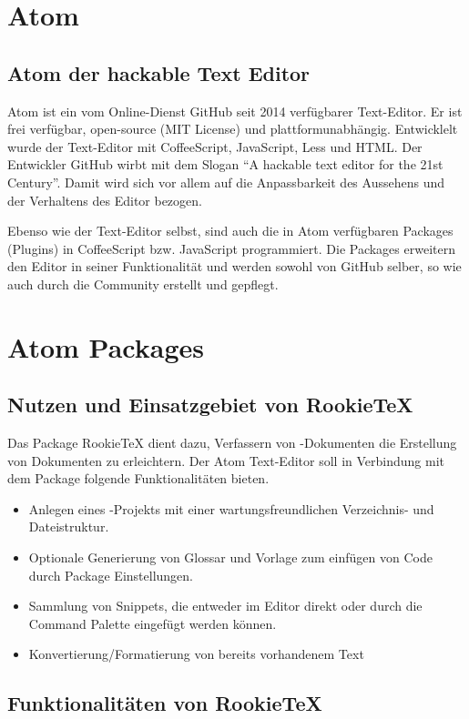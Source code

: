 \chapter{Atom}
    \section{Atom der hackable Text Editor}
    Atom ist ein vom Online-Dienst GitHub seit 2014 verfügbarer Text-Editor. Er ist frei verfügbar, open-source (MIT License) und plattformunabhängig. Entwicklelt wurde der Text-Editor mit CoffeeScript, JavaScript, Less und HTML. Der Entwickler GitHub wirbt mit dem Slogan "`A hackable text editor for the 21st Century"'. Damit wird sich vor allem auf die Anpassbarkeit des Aussehens und der Verhaltens des Editor bezogen.

    Ebenso wie der Text-Editor selbst, sind auch die in Atom verfügbaren Packages (Plugins) in CoffeeScript bzw. JavaScript programmiert. Die Packages erweitern den Editor in seiner Funktionalität und werden sowohl von GitHub selber, so wie auch durch die Community erstellt und gepflegt.

\chapter{Atom Packages}
    \section{Nutzen und Einsatzgebiet von RookieTeX}
    Das Package RookieTeX dient dazu, Verfassern von \tex-Dokumenten die Erstellung von Dokumenten zu erleichtern. Der Atom Text-Editor soll in Verbindung mit dem Package folgende Funktionalitäten bieten.

    \begin{itemize}
        \item Anlegen eines \tex-Projekts mit einer wartungsfreundlichen Verzeichnis- und Dateistruktur.
        \item Optionale Generierung von Glossar und Vorlage zum einfügen von Code durch Package Einstellungen.
        \item Sammlung von Snippets, die entweder im Editor direkt oder durch die Command Palette eingefügt werden können.
        \item Konvertierung/Formatierung von bereits vorhandenem Text
    \end{itemize}

    \section{Funktionalitäten von RookieTeX}
